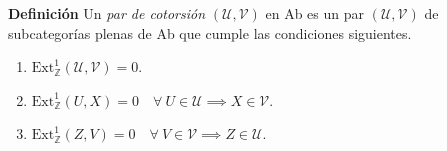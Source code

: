 \documentclass[preview]{standalone}
\begin{document}
\begin{center}
\justifying \textbf{Definición} Un \emph{par de cotorsión} $(\mathcal{U}, \mathcal{V})$ en Ab es un par $(\mathcal{U}, \mathcal{V})$ de subcategorías plenas de Ab que cumple las condiciones siguientes.\begin{enumerate} \item $\text{Ext}^1_\mathbb{Z} (\mathcal{U}, \mathcal{V}) = 0$.\item $\text{Ext}^1_\mathbb{Z} (U, X) = 0 \quad \forall \ U\in\mathcal{U} \implies X\in\mathcal{V}$. \item $\text{Ext}^1_\mathbb{Z} (Z, V) = 0 \quad \forall \ V\in\mathcal{V} \implies Z\in\mathcal{U}$. \end{enumerate}
\end{center}
\end{document}

